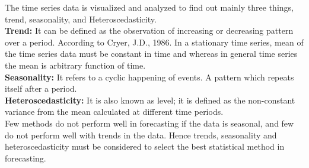 \documentclass[12pt,a4paper]{article}
\begin{document}
\begin{flushleft}
		The time series data is visualized and analyzed to find out mainly three things, trend, seasonality, and Heteroscedasticity. \\
		
		\textbf{Trend:} It can be defined as the observation of increasing or decreasing pattern over a period. According to Cryer, J.D., 1986. In a stationary time series, mean of the time series data must be constant in time and whereas in general time series the mean is arbitrary function of time.\\
		
		\textbf{Seasonality:} It refers to a cyclic happening of events. A pattern which repeats itself after a period.\\
		
		\textbf{Heteroscedasticity:} It is also known as level; it is defined as the non-constant variance from the mean calculated at different time periods.\\
		
		Few methods do not perform well in forecasting if the data is seasonal, and few do not perform well with trends in the data. Hence trends, seasonality and heteroscedasticity must be considered to select the best statistical method in forecasting. 
		

\end{flushleft}
\end{document}
